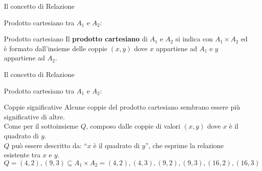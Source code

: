 \begin{frame}{Il concetto di Relazione}
\begin{minipage}[t]{0.4\linewidth}
Prodotto cartesiano tra $A_1$ e $A_2$:
\pause
\begin{center}
\cartesianproductAOneATwo
\end{center}
\end{minipage}%
\hfill%
\begin{minipage}[t]{0.6\linewidth}
\begin{block}{Prodotto cartesiano}
Il \textbf{prodotto cartesiano} di $A_1$ e $A_2$ si indica con $A_1 \times A_2$ ed \`e formato dall'insieme delle coppie $(x,y)$ dove $x$ appartiene ad $A_1$ e $y$ appartiene ad $A_2$.
\end{block}
\end{minipage}
\end{frame}
%
\begin{frame}{Il concetto di Relazione}
\begin{minipage}[t]{0.4\linewidth}
Prodotto cartesiano tra $A_1$ e $A_2$:
\begin{center}
\cartesianproductRedQ
\end{center}
\end{minipage}%
\hfill%
\begin{minipage}[t]{0.6\linewidth}
\begin{block}{Coppie significative}
Alcune coppie del prodotto cartesiano sembrano essere pi\`u significative di altre.
\pause
\\Come per il sottoinsieme $Q$, composo dalle coppie di valori $(x,y)$ dove $x$ \`e il quadrato di $y$.
\pause
\newline
\\ $Q$ pu\`o essere descritto da: ``$x$ \`e il quadrato di $y$'', che esprime la relazione esistente tra $x$ e $y$.
{\scriptsize \[ Q = {(4,2),(9,3)} \subseteq A_1 \times A_2 = {(4,2),(4,3),(9,2),(9,3),(16,2),(16,3)} \]}
\end{block}
\end{minipage}
\end{frame}
%
